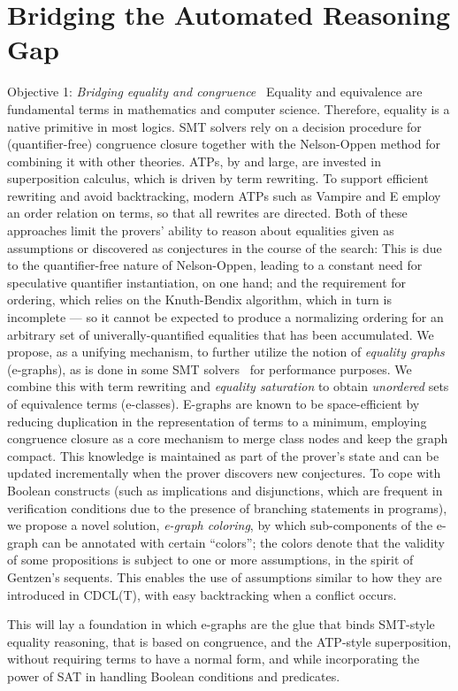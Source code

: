 \section{Bridging the Automated Reasoning Gap}


\begin{paragraph}{Objective 1: {\it Bridging equality and congruence}}~
Equality and equivalence are fundamental terms in mathematics and computer science.
Therefore, equality is a native primitive in most logics.
SMT solvers rely on a decision procedure for (quantifier-free) congruence closure together with the Nelson-Oppen method for combining it with other theories.
ATPs, by and large, are invested in superposition calculus, which is driven by term rewriting.
To support efficient rewriting and avoid backtracking, modern ATPs such as Vampire and E employ an order relation on terms, so that all rewrites are directed.
Both of these approaches limit the provers' ability to reason about equalities given as assumptions or discovered as conjectures in the course of the search:
This is due to the quantifier-free nature of Nelson-Oppen, leading to a constant need for speculative quantifier instantiation, on one hand;
and the requirement for ordering, which relies on the Knuth-Bendix algorithm, which in turn is incomplete --- so it cannot be expected to produce a normalizing ordering for an arbitrary set of univerally-quantified equalities that has been accumulated.
We propose, as a unifying mechanism, to further utilize the notion of \emph{equality graphs} (e-graphs), as is done in some SMT solvers~\citeneeded{} for performance purposes.
We combine this with term rewriting and \emph{equality saturation} to obtain \emph{unordered} sets of equivalence terms (e-classes).
E-graphs are known to be space-efficient by reducing duplication in the representation of terms to a minimum, employing congruence closure as a core mechanism to merge class nodes and keep the graph compact.
This knowledge is maintained as part of the prover's state and can be updated incrementally when the prover discovers new conjectures.
To cope with Boolean constructs (such as implications and disjunctions, which are frequent in verification conditions due to the presence of branching statements in programs), we propose a novel solution, \emph{e-graph coloring}, by which sub-components of the e-graph can be annotated with certain ``colors''; the colors denote that the validity of some propositions is subject to one or more assumptions, in the spirit of Gentzen's sequents.
This enables the use of assumptions similar to how they are introduced in CDCL(T), with easy backtracking when a conflict occurs.

This will lay a foundation in which e-graphs are the glue that binds SMT-style equality reasoning, that is based on congruence, and the ATP-style superposition, without requiring terms to have a normal form, and while incorporating the power of SAT in handling Boolean conditions and predicates.
\end{paragraph}

